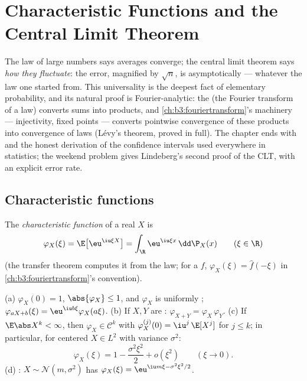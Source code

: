 \chapter{Characteristic Functions and the Central Limit
Theorem}\label{ch:b3:clt}

The law of large numbers says averages converge; the central
limit theorem says \emph{how they fluctuate}: the error,
magnified by $\sqrt n$, is asymptotically  ---
whatever the law one started from. This universality is the
deepest fact of elementary probability, and its natural proof
is Fourier-analytic: the \emph{}
(the Fourier transform of a law) converts  sums
into products, and \cref{ch:b3:fouriertransform}'s machinery
--- injectivity,  fixed points --- converts pointwise
convergence of these products into convergence of laws
(L\'evy's theorem, proved in full). The chapter ends with
 and the honest derivation of the confidence
intervals used everywhere in statistics; the weekend problem
gives Lindeberg's second proof of the CLT, with an explicit
error rate.

\section{Characteristic functions}

\begin{definition}\label{def:b3:clt:cf}
The \emph{characteristic function} of a real  $X$ is
\[
\varphi_X(\xi) = \E\bigl[\eu^{\iu\xi X}\bigr]
= \int_\R \eu^{\iu\xi x}\,\dd\P_X(x)
\qquad (\xi \in \R)
\]
(the transfer theorem computes it from the law; for a 
$f$, $\varphi_X(\xi) = \hat f(-\xi)$ in
\cref{ch:b3:fouriertransform}'s convention).
\end{definition}

\begin{proposition}\label{prop:b3:clt:cfbasics}
(a) $\varphi_X(0) = 1$, $\abs{\varphi_X} \leq 1$, and
$\varphi_X$ is uniformly ;
$\varphi_{aX + b}(\xi) = \eu^{\iu b\xi}\varphi_X(a\xi)$.
(b) If $X, Y$ are \emph{}:
$\varphi_{X+Y} = \varphi_X\,\varphi_Y$.
(c) If $\E\abs X^k < \infty$, then $\varphi_X \in \mathcal
C^k$ with $\varphi_X^{(j)}(0) = \iu^j\,\E[X^j]$ for $j \leq
k$; in particular, for centered $X \in L^2$ with variance
$\sigma^2$:
\[
\varphi_X(\xi) = 1 - \frac{\sigma^2\xi^2}{2} +
o(\xi^2) \qquad (\xi \to 0).
\]
(d) : $X \sim \mathcal N(m, \sigma^2)$ has
$\varphi_X(\xi) = \eu^{\iu m\xi - \sigma^2\xi^2/2}$.
\end{proposition}

